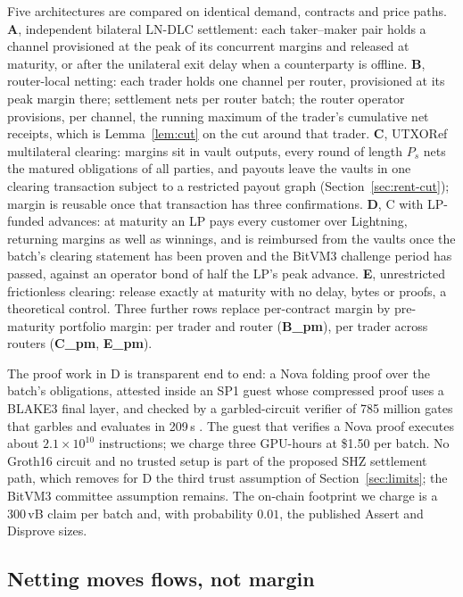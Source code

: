Five architectures are compared on identical demand, contracts and price paths. \textbf{A}, independent bilateral LN-DLC settlement: each taker--maker pair holds a channel provisioned at the peak of its concurrent margins and released at maturity, or after the unilateral exit delay when a counterparty is offline. \textbf{B}, router-local netting: each trader holds one channel per router, provisioned at its peak margin there; settlement nets per router batch; the router operator provisions, per channel, the running maximum of the trader's cumulative net receipts, which is Lemma~\ref{lem:cut} on the cut around that trader. \textbf{C}, UTXORef multilateral clearing: margins sit in vault outputs, every round of length $P_s$ nets the matured obligations of all parties, and payouts leave the vaults in one clearing transaction subject to a restricted payout graph (Section~\ref{sec:rent-cut}); margin is reusable once that transaction has three confirmations. \textbf{D}, C with LP-funded advances: at maturity an LP pays every customer over Lightning, returning margins as well as winnings, and is reimbursed from the vaults once the batch's clearing statement has been proven and the BitVM3 challenge period has passed, against an operator bond of half the LP's peak advance. \textbf{E}, unrestricted frictionless clearing: release exactly at maturity with no delay, bytes or proofs, a theoretical control. Three further rows replace per-contract margin by pre-maturity portfolio margin: per trader and router (\textbf{B\_pm}), per trader across routers (\textbf{C\_pm}, \textbf{E\_pm}).

The proof work in D is transparent end to end: a Nova folding proof \citep{kothari2022nova} over the batch's obligations, attested inside an SP1 guest whose compressed proof uses a BLAKE3 final layer, and checked by a garbled-circuit verifier of 785 million gates that garbles and evaluates in 209\,s \citep{spiral2026}. The guest that verifies a Nova proof executes about $2.1\times10^{10}$ instructions; we charge three GPU-hours at \$1.50 per batch. No Groth16 circuit and no trusted setup is part of the proposed SHZ settlement path, which removes for D the third trust assumption of Section~\ref{sec:limits}; the BitVM3 committee assumption remains. The on-chain footprint we charge is a 300\,vB claim per batch and, with probability $0.01$, the published Assert and Disprove sizes.

\subsection{Netting moves flows, not margin}
\label{sec:rent-netting}

